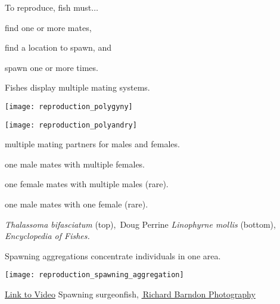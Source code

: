 \label{key}\documentclass[t]{beamer}
\begin{document}
\begin{frame}[t]{To reproduce, fish must$\dots$}

\hangpara find one or more mates, 

\hangpara find a location to spawn, and

\hangpara spawn one or more times.

\end{frame}


\begin{frame}[t]{Fishes display multiple mating systems.}


\vspace{-\baselineskip}

\begin{multicols}{2}

\hfill\texttt{[image: reproduction\_polygyny]}

\hfill\texttt{[image: reproduction\_polyandry]}

\columnbreak

 multiple mating partners for males and females.

\vspace{\baselineskip}

 one male mates with multiple females.

\vspace{\baselineskip}

 one female mates with multiple males (rare).

\vspace{\baselineskip}

 one male mates with one female (rare).

\end{multicols}


\vfilll

\tiny \textit{Thalassoma bifasciatum} (top), \textcopyright\,Doug Perrine \hfill \textit{Linophyrne mollis} (bottom), \emph{Encyclopedia of Fishes.}


\end{frame}


\begin{frame}[t]{Spawning aggregations concentrate individuals in one area.}

\vspace{-0.5\baselineskip}
\texttt{[image: reproduction\_spawning\_aggregation]}

\vfilll

\tiny \href{https://www.youtube.com/watch?v=bpLMCyx9cic}{Link to Video} \hfill Spawning surgeonfish, \href{http://www.richardbarnden.com/spawning-1}{\textcopyright\,Richard Barndon Photography}
\end{frame}
\end{document}
